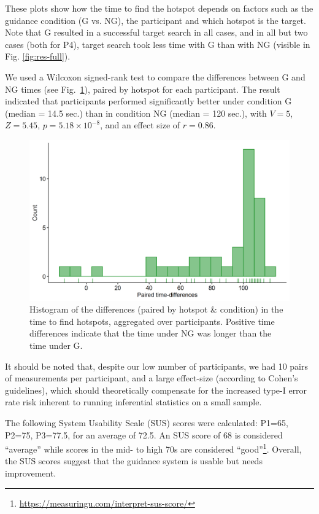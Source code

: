\documentclass[runningheads]{res/templates/llncs}
\begin{document}
These plots show how the time to find the hotspot depends on factors such as the guidance condition (G vs. NG), the participant and which hotspot is the target. Note that G resulted in a successful target search in all cases, and in all but two cases (both for P4), target search took less time with G than with NG (visible in Fig. \ref{fig:res-full}).

We used a Wilcoxon signed-rank test to compare the differences between G and NG times (see Fig.~\ref{fig:res-diff}), paired by hotspot for each participant. The result indicated that participants performed significantly better under condition G (median = 14.5 sec.) than in condition NG (median = 120 sec.), with $V=5$, $Z=5.45$, $p = 5.18 \times 10^{-8}$, and an effect size of $r = 0.86$. 

\begin{figure}[h!]
\includegraphics[width=11.5cm, keepaspectratio,]{res/img/hist_diff.png}
\caption{Histogram of the differences (paired by hotspot \& condition) in the time to find hotspots, aggregated over participants. Positive time differences indicate that the time under NG was longer than the time under G.}
\label{fig:res-diff}
\end{figure}

It should be noted that, despite our low number of participants, we had 10 pairs of measurements per participant, and a large effect-size (according to Cohen's guidelines), which should theoretically compensate for the increased type-I error rate risk inherent to running inferential statistics on a small sample.

The following System Usability Scale (SUS) scores were calculated: P1=65, P2=75, P3=77.5, for an average of 72.5. 
An SUS score of 68 is considered ``average'' while scores in the mid- to high 70s are considered ``good''\footnote{\url{https://measuringu.com/interpret-sus-score/}}.
Overall, the SUS scores suggest that the guidance system is usable but needs improvement.
\end{document}
